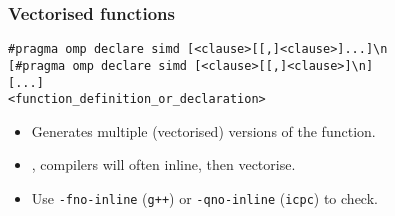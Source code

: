 \documentclass[14pt,aspectratio=169,dvipsnames,table]{beamer}
\begin{document}
\begin{frame}[fragile]
  \frametitle{Vectorised functions}
  {\small
\begin{lstlisting}
#pragma omp declare simd [<clause>[[,]<clause>]...]\n
[#pragma omp declare simd [<clause>[[,]<clause>]\n]
[...]
<function_definition_or_declaration>
\end{lstlisting}}

    \vskip 16pt

    \begin{itemize}[wide=0pt, itemsep=11pt, topsep=11pt]
    \item Generates multiple (vectorised) versions of the function.
    \item {}, compilers will often inline, then vectorise.
    \item Use \verb#-fno-inline# (\verb#g++#) or
      \verb#-qno-inline# (\verb#icpc#) to check.
    \end{itemize}

\end{frame}
\end{document}

